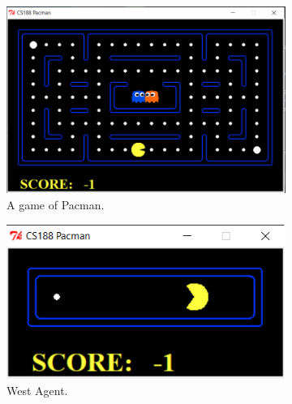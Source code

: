\documentclass[a4paper,12pt]{report}
\begin{document}
\vspace{0.5cm}
\begin{figure}[h!]
  \centering
  \begin{subfigure}[b]{0.6\linewidth}
    \includegraphics[width=\linewidth]{pictures/pacman.png}
    \caption{A game of Pacman.}
  \end{subfigure}
  \begin{subfigure}[b]{0.4\linewidth}
    \includegraphics[width=\linewidth]{pictures/pacman2.png}
    \caption{West Agent.}
  \end{subfigure}
\hspace{0.5cm}
	\begin{subfigure}[b]{0.3\linewidth}

\end{subfigure}
\end{figure}
\end{document}
